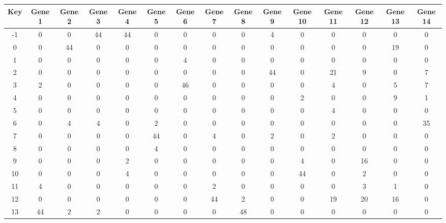 \begin{tabular}{|c|c|c|c|c|c|c|c|c|c|c|c|c|c|c|}
\hline
Key & Gene 1 & Gene 2 & Gene 3 & Gene 4 & Gene 5 & Gene 6 & Gene 7 & Gene 8 & Gene 9 & Gene 10 & Gene 11 & Gene 12 & Gene 13 & Gene 14 \\
\hline
-1 & 0 & 0 & 44 & 44 & 0 & 0 & 0 & 0 & 4 & 0 & 0 & 0 & 0 & 0 \\
0 & 0 & 44 & 0 & 0 & 0 & 0 & 0 & 0 & 0 & 0 & 0 & 0 & 19 & 0 \\
1 & 0 & 0 & 0 & 0 & 0 & 4 & 0 & 0 & 0 & 0 & 0 & 0 & 0 & 0 \\
2 & 0 & 0 & 0 & 0 & 0 & 0 & 0 & 0 & 44 & 0 & 21 & 9 & 0 & 7 \\
3 & 2 & 0 & 0 & 0 & 0 & 46 & 0 & 0 & 0 & 0 & 4 & 0 & 5 & 7 \\
4 & 0 & 0 & 0 & 0 & 0 & 0 & 0 & 0 & 0 & 2 & 0 & 0 & 9 & 1 \\
5 & 0 & 0 & 0 & 0 & 0 & 0 & 0 & 0 & 0 & 0 & 4 & 0 & 0 & 0 \\
6 & 0 & 4 & 4 & 0 & 2 & 0 & 0 & 0 & 0 & 0 & 0 & 0 & 0 & 35 \\
7 & 0 & 0 & 0 & 0 & 44 & 0 & 4 & 0 & 2 & 0 & 2 & 0 & 0 & 0 \\
8 & 0 & 0 & 0 & 0 & 4 & 0 & 0 & 0 & 0 & 0 & 0 & 0 & 0 & 0 \\
9 & 0 & 0 & 0 & 2 & 0 & 0 & 0 & 0 & 0 & 4 & 0 & 16 & 0 & 0 \\
10 & 0 & 0 & 0 & 4 & 0 & 0 & 0 & 0 & 0 & 44 & 0 & 2 & 0 & 0 \\
11 & 4 & 0 & 0 & 0 & 0 & 0 & 2 & 0 & 0 & 0 & 0 & 3 & 1 & 0 \\
12 & 0 & 0 & 0 & 0 & 0 & 0 & 44 & 2 & 0 & 0 & 19 & 20 & 16 & 0 \\
13 & 44 & 2 & 2 & 0 & 0 & 0 & 0 & 48 & 0 & 0 & 0 & 0 & 0 & 0 \\
\hline
\end{tabular}